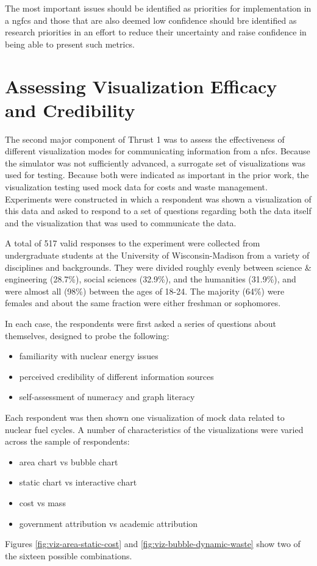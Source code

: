 The most important issues should be identified as priorities for
implementation in a \gls{ngfcs} and those that are also deemed low confidence
should bre identified as research priorities in an effort to reduce their
uncertainty and raise confidence in being able to present such metrics.

\section{Assessing Visualization Efficacy and Credibility} %

The second major component of Thrust 1 was to assess the effectiveness of
different visualization modes for communicating information from a \gls{nfcs}.
Because the \Cyclus simulator was not sufficiently advanced, a surrogate set
of visualizations was used for testing.  Because both were indicated as
important in the prior work, the visualization testing used mock data for
costs and waste management.  Experiments were constructed in which a
respondent was shown a visualization of this data and asked to respond to a
set of questions regarding both the data itself and the visualization that was
used to communicate the data.

A total of 517 valid responses to the experiment were collected from
undergraduate students at the University of Wisconsin-Madison from a variety
of disciplines and backgrounds.  They were divided roughly evenly between
science \& engineering (28.7\%), social sciences (32.9\%), and the humanities
(31.9\%), and were almost all (98\%) between the ages of 18-24.  The majority
(64\%) were females and about the same fraction were either freshman or
sophomores.

In each case, the respondents were first asked a series of questions about
themselves, designed to probe the following:
\begin{itemize}
\item familiarity with nuclear energy issues
\item perceived credibility of different information sources
\item self-assessment of numeracy and graph literacy
\end{itemize}

Each respondent was then shown one visualization of mock data related to
nuclear fuel cycles.  A number of characteristics of the visualizations were
varied across the sample of respondents:
\begin{itemize}
\item area chart vs bubble chart
\item static chart vs interactive chart
\item cost vs mass
\item government attribution vs academic attribution
\end{itemize}
Figures \ref{fig:viz-area-static-cost} and \ref{fig:viz-bubble-dynamic-waste}
show two of the sixteen possible combinations.

